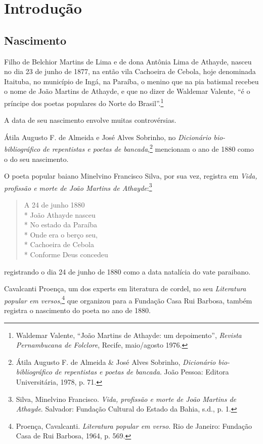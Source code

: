 \chapter[Introdução, por Mário Souto Maior]{Introdução}

\section{Nascimento}

Filho de Belchior Martins de Lima e de dona Antônia
Lima de Athayde, nasceu no dia 23 de junho de 1877, na
então vila Cachoeira de Cebola, hoje denominada Itaituba,
no município de Ingá, na Paraíba, o menino que na pia
batismal recebeu o nome de João Martins de Athayde, e
que no dizer de Waldemar Valente, ``é o príncipe dos poetas
populares do Norte do Brasil''.\footnote{ Waldemar
Valente, ``João Martins de Athayde: um
depoimento'', \textit{Revista Pernambucana de
Folclore}, Recife, maio/agosto 1976.}

A data de seu nascimento envolve muitas controvérsias.

Átila Augusto F. de Almeida e José Alves Sobrinho, no
\textit{Dicionário bio-bibliográfico de repentistas e poetas de
bancada},\footnote{ Átila Augusto F. de Almeida \& José Alves Sobrinho,
\textit{Dicionário bio-bibliográfico de repentistas e poetas de
bancada}. João Pessoa: Editora Universitária, 1978, p. 71.}
mencionam o ano de 1880 como o do seu
nascimento.

O poeta popular baiano Minelvino Francisco Silva, por
sua vez, registra em \textit{Vida, profissão e morte de João Martins
de Athayde}:\footnote{ Silva, Minelvino Francisco. \textit{Vida, profissão e
morte de João Martins de Athayde}. Salvador: Fundação
Cultural do Estado da Bahia, s.d., p. 1.}


\begin{verse}

A 24 de junho 1880\\*
João Athayde nasceu\\*
No estado da Paraíba\\*
Onde era o berço seu,\\*
Cachoeira de Cebola\\*
Conforme Deus concedeu

\end{verse}

\noindent registrando o dia 24 de junho de 1880 como a data natalícia
do vate paraibano.

Cavalcanti Proença, um dos experts em literatura de
cordel, no seu \textit{Literatura popular em versos},\footnote{ Proença,
Cavalcanti. \textit{Literatura popular em verso}. Rio de Janeiro: Fundação
Casa de Rui Barbosa, 1964, p. 569.} que organizou
para a Fundação Casa Rui Barbosa, também registra o
nascimento do poeta no ano de 1880.

